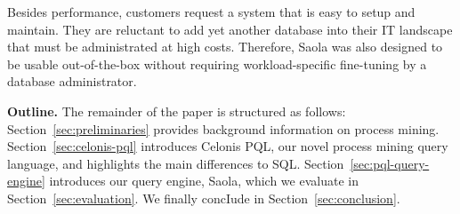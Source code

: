 Besides performance, customers request a system that is easy to setup and maintain. They are reluctant to add yet another database into their IT landscape that must be administrated at high costs. Therefore, Saola was also designed to be usable out-of-the-box without requiring workload-specific fine-tuning by a database administrator.

\par\smallskip\noindent \textbf{Outline.} The remainder of the paper is
structured as follows: Section~\ref{sec:preliminaries} provides background
information on process mining. Section~\ref{sec:celonis-pql} introduces Celonis
PQL, our novel process mining query language, and highlights the main
differences to SQL. Section~\ref{sec:pql-query-engine} introduces our query
engine, Saola, which we evaluate in Section~\ref{sec:evaluation}. We finally
concIude in Section~\ref{sec:conclusion}.
